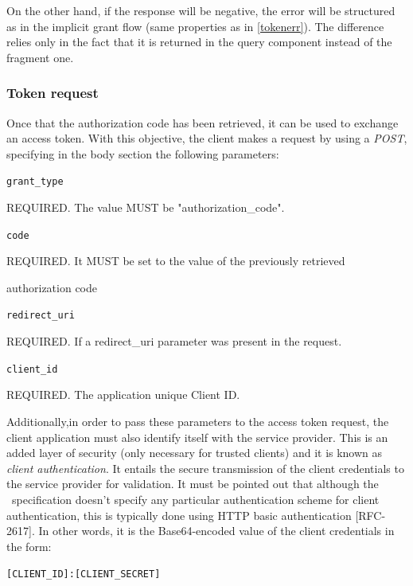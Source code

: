 On the other hand, if the response will be negative, the error will be structured as in the implicit grant flow (same properties as in \ref{tokenerr}). The difference relies only in the fact that it is returned in the query component instead of the fragment one.


\subsubsection{Token request}
Once that the authorization code has been retrieved, it can be used to exchange an access token. With this objective, the client makes a request by using a \textit{POST}, specifying in the body section the following parameters:

\texttt{grant\_type}

\hspace{0.5cm}REQUIRED. The value MUST be "authorization\_code".

\texttt{code}

\hspace{0.5cm}REQUIRED. It MUST be set to the value of the previously retrieved

\hspace{0.5cm}authorization code

\texttt{redirect\_uri}

\hspace{0.5cm}REQUIRED. If a redirect\_uri parameter was present in the request.

\texttt{client\_id}

\hspace{0.5cm}REQUIRED. The application unique Client ID.

\vspace{0.5cm}

Additionally,in order to pass these parameters to the access token request, the client
application must also identify itself with the service provider. This is an added
layer of security (only necessary for trusted clients) and it is known as \textit{client
authentication}.
It entails the secure transmission of the client credentials to the service provider for validation. It must be pointed out that although the \oauth\ specification doesn't specify any particular authentication scheme for client authentication, this is typically done using HTTP basic authentication [RFC-2617].
In other words, it is the Base64-encoded value of the client credentials in
the form:

\hspace{0.5cm}\texttt{[CLIENT\_ID]:[CLIENT\_SECRET]}

